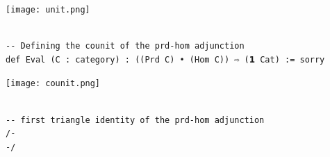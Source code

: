\documentclass{book}
\newcounter{lcounter}
\begin{document}
\begin{center}
\begin{tcolorbox}[width=5in,colback={white},title={\begin{center}\texttt{Graphic} \addtocounter{lcounter}{1}  \end{center}},colbacktitle=Yellow,coltitle=black]

\begin{center}
\texttt{[image: unit.png]}
\end{center}

\end{tcolorbox}
\end{center}


\begin{center}
\begin{tcolorbox}[width=5in,colback={white},title={\begin{center}\texttt{Lean \thelcounter} \addtocounter{lcounter}{1}  \end{center}},colbacktitle=Blue,coltitle=black]
\begin{verbatim}

-- Defining the counit of the prd-hom adjunction
def Eval (C : category) : ((Prd C) • (Hom C)) ⇨ (𝟭 Cat) := sorry

\end{verbatim}%
\end{tcolorbox}
\end{center}


\begin{center}
\begin{tcolorbox}[width=5in,colback={white},title={\begin{center}\texttt{Graphic} \addtocounter{lcounter}{1}  \end{center}},colbacktitle=Yellow,coltitle=black]

\begin{center}
\texttt{[image: counit.png]}
\end{center}

\end{tcolorbox}
\end{center}


\begin{center}
\begin{tcolorbox}[width=5in,colback={white},title={\begin{center}\texttt{Lean \thelcounter} \addtocounter{lcounter}{1}  \end{center}},colbacktitle=Blue,coltitle=black]
\begin{verbatim}

-- first triangle identity of the prd-hom adjunction
/-
-/

\end{verbatim}%
\end{tcolorbox}
\end{center}
\end{document}
